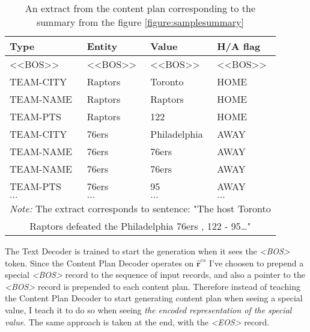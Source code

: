 \begin{table}[h]
    \centering \small
    \begin{tabular}{llll}
        \toprule
        \textbf{Type} & \textbf{Entity} & \textbf{Value} & \textbf{H/A flag} \\                  
        \midrule
        \textless{}\textless{}BOS\textgreater{}\textgreater{} & \textless{}\textless{}BOS\textgreater{}\textgreater{} & \textless{}\textless{}BOS\textgreater{}\textgreater{} & \textless{}\textless{}BOS\textgreater{}\textgreater{} \\
        TEAM-CITY    & Raptors      & Toronto      & HOME                                                  \\
        TEAM-NAME    & Raptors      & Raptors      & HOME                                                  \\
        TEAM-PTS     & Raptors      & 122          & HOME                                                  \\
        TEAM-CITY    & 76ers        & Philadelphia & AWAY                                                  \\
        TEAM-NAME    & 76ers        & 76ers        & AWAY                                                  \\
        TEAM-NAME    & 76ers        & 76ers        & AWAY                                                  \\
        TEAM-PTS     & 76ers        & 95           & AWAY                                                  \\
        $\dots$      & $\dots$      & $\dots$      & $\dots$ \\                                        
        \bottomrule
        \multicolumn{4}{c}{\footnotesize \textit{Note:} The extract corresponds to sentence: "The host Toronto} \\
        \multicolumn{4}{c}{\footnotesize Raptors defeated the Philadelphia 76ers , 122 - 95\dots "}
    \end{tabular}
    \caption{An extract from the content plan corresponding to the summary from the figure \ref{figure:samplesummary}}
\end{table}

The Text Decoder is trained to start the generation when it sees the \emph{\textless BOS\textgreater} token. Since the Content Plan Decoder operates on $\hat{\boldsymbol{r}}^{cs}$ I've choosen to prepend a special \emph{\textless BOS\textgreater} record to the sequence of input records, and also a pointer to the \emph{\textless BOS\textgreater} record is prepended to each content plan. Therefore instead of teaching the Content Plan Decoder to start generating content plan when seeing a special value, I teach it to do so when seeing \emph{the encoded representation of the special value}. The same approach is taken at the end, with the \emph{\textless EOS\textgreater} record.

